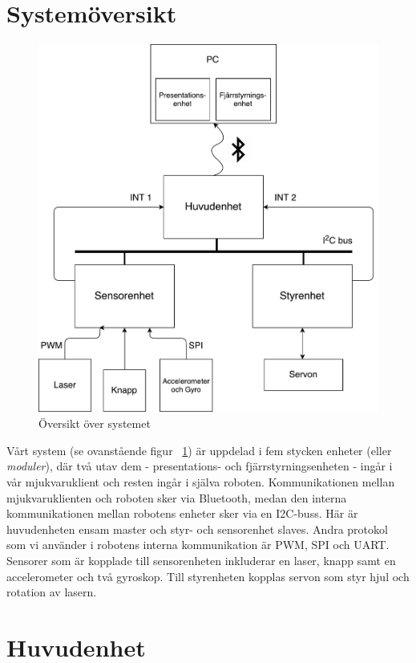 \documentclass{article}
\begin{document}
\section{Systemöversikt}
\begin{figure}[H]
\centering
\includegraphics[scale=0.35]{oversikt_systemet}
\caption{Översikt över systemet}
\label{fig:oversikt_systemet}
\end{figure}
Vårt system (se ovanstående figur ~\ref{fig:oversikt_systemet}) är uppdelad i fem stycken enheter (eller \textit{moduler}), där två utav dem - presentations- och fjärrstyrningsenheten - ingår i vår mjukvaruklient och resten ingår i själva roboten. Kommunikationen mellan mjukvaruklienten och roboten sker via Bluetooth, medan den interna kommunikationen mellan robotens enheter sker via en I2C-buss. Här är huvudenheten ensam master och styr- och sensorenhet slaves. Andra protokol som vi använder i robotens interna kommunikation är PWM, SPI och UART. Sensorer som är kopplade till sensorenheten inkluderar en laser, knapp samt en accelerometer och två gyroskop. Till styrenheten kopplas servon som styr hjul och rotation av lasern.

\section{Huvudenhet}
\end{document}
